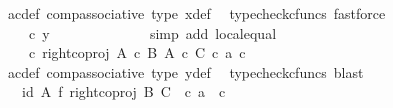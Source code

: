\begin{isabellebody}
\ ac{\isacharunderscore}{\kern0pt}def\ comp{\isacharunderscore}{\kern0pt}associative{}\ {\isasymphi}{\isacharunderscore}{\kern0pt}type\ x{\isacharprime}{\kern0pt}{\isacharunderscore}{\kern0pt}def\ \isamarkupfalse%
\ {\isacharparenleft}{\kern0pt}typecheck{\isacharunderscore}{\kern0pt}cfuncs{\isacharcomma}{\kern0pt}\ fastforce{\isacharparenright}{\kern0pt}\isanewline
\ \ \ \ \ \ \ \ \ \ \isamarkupfalse%
\ \isamarkupfalse%
\ {\isachardoublequoteopen}{\isachardot}{\kern0pt}{\isachardot}{\kern0pt}{\isachardot}{\kern0pt}\ {\isacharequal}{\kern0pt}\ {\isasymphi}\ {\isasymcirc}\isactrlsub c\ y{\isachardoublequoteclose}\isanewline
\ \ \ \ \ \ \ \ \ \ \ \ \isamarkupfalse%
\ {\isacharparenleft}{\kern0pt}simp\ add{\isacharcolon}{\kern0pt}\ local{\isachardot}{\kern0pt}equal{\isacharparenright}{\kern0pt}\isanewline
\ \ \ \ \ \ \ \ \ \ \isamarkupfalse%
\ \isamarkupfalse%
\ {\isachardoublequoteopen}{\isachardot}{\kern0pt}{\isachardot}{\kern0pt}{\isachardot}{\kern0pt}\ {\isacharequal}{\kern0pt}\ {\isacharparenleft}{\kern0pt}{\isasymphi}\ {\isasymcirc}\isactrlsub c\ right{\isacharunderscore}{\kern0pt}coproj\ {\isacharparenleft}{\kern0pt}A\ {\isasymtimes}\isactrlsub c\ B{\isacharparenright}{\kern0pt}\ {\isacharparenleft}{\kern0pt}A\ {\isasymtimes}\isactrlsub c\ C{\isacharparenright}{\kern0pt}{\isacharparenright}{\kern0pt}\ {\isasymcirc}\isactrlsub c\ {\isasymlangle}a{\isacharprime}{\kern0pt}{\isacharcomma}{\kern0pt}\ c{\isacharprime}{\kern0pt}{\isasymrangle}{\isachardoublequoteclose}\isanewline
\ \ \ \ \ \ \ \ \ \ \ \ \isamarkupfalse%
\ a{\isacharprime}{\kern0pt}c{\isacharprime}{\kern0pt}{\isacharunderscore}{\kern0pt}def\ comp{\isacharunderscore}{\kern0pt}associative{}\ {\isasymphi}{\isacharunderscore}{\kern0pt}type\ y{\isacharprime}{\kern0pt}{\isacharunderscore}{\kern0pt}def\ \isamarkupfalse%
\ {\isacharparenleft}{\kern0pt}typecheck{\isacharunderscore}{\kern0pt}cfuncs{\isacharcomma}{\kern0pt}\ blast{\isacharparenright}{\kern0pt}\isanewline
\ \ \ \ \ \ \ \ \ \ \isamarkupfalse%
\ \isamarkupfalse%
\ {\isachardoublequoteopen}{\isachardot}{\kern0pt}{\isachardot}{\kern0pt}{\isachardot}{\kern0pt}\ {\isacharequal}{\kern0pt}\ {\isacharparenleft}{\kern0pt}id\ A\ {\isasymtimes}\isactrlsub f\ right{\isacharunderscore}{\kern0pt}coproj\ B\ C{\isacharparenright}{\kern0pt}\ \ {\isasymcirc}\isactrlsub c\ {\isasymlangle}a{\isacharprime}{\kern0pt}{\isacharcomma}{\kern0pt}\ \ c{\isacharprime}{\kern0pt}{\isasymrangle}{\isachardoublequoteclose}\isanewline

\end{isabellebody}
